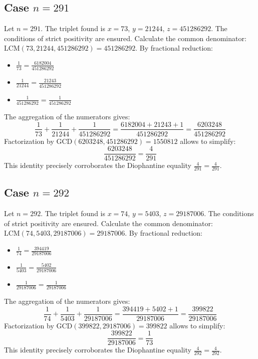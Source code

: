 \documentclass[11pt,a4paper]{article}
\begin{document}
\subsection{Case $n = 291$}
Let $n = 291$. The triplet found is $x = 73$, $y = 21244$, $z = 451286292$.
The conditions of strict positivity are ensured.
Calculate the common denominator: $\text{LCM}(73, 21244, 451286292) = 451286292$.
By fractional reduction:
\begin{itemize}
    \item $\frac{1}{73} = \frac{6182004}{451286292}$
    \item $\frac{1}{21244} = \frac{21243}{451286292}$
    \item $\frac{1}{451286292} = \frac{1}{451286292}$
\end{itemize}
The aggregation of the numerators gives:
$$ \frac{1}{73} + \frac{1}{21244} + \frac{1}{451286292} = \frac{6182004 + 21243 + 1}{451286292} = \frac{6203248}{451286292} $$
Factorization by $\text{GCD}(6203248, 451286292) = 1550812$ allows to simplify:
$$ \frac{6203248}{451286292} = \frac{4}{291} $$
This identity precisely corroborates the Diophantine equality $\frac{4}{291} = \frac{4}{291}$.

\subsection{Case $n = 292$}
Let $n = 292$. The triplet found is $x = 74$, $y = 5403$, $z = 29187006$.
The conditions of strict positivity are ensured.
Calculate the common denominator: $\text{LCM}(74, 5403, 29187006) = 29187006$.
By fractional reduction:
\begin{itemize}
    \item $\frac{1}{74} = \frac{394419}{29187006}$
    \item $\frac{1}{5403} = \frac{5402}{29187006}$
    \item $\frac{1}{29187006} = \frac{1}{29187006}$
\end{itemize}
The aggregation of the numerators gives:
$$ \frac{1}{74} + \frac{1}{5403} + \frac{1}{29187006} = \frac{394419 + 5402 + 1}{29187006} = \frac{399822}{29187006} $$
Factorization by $\text{GCD}(399822, 29187006) = 399822$ allows to simplify:
$$ \frac{399822}{29187006} = \frac{1}{73} $$
This identity precisely corroborates the Diophantine equality $\frac{4}{292} = \frac{4}{292}$.
\end{document}
